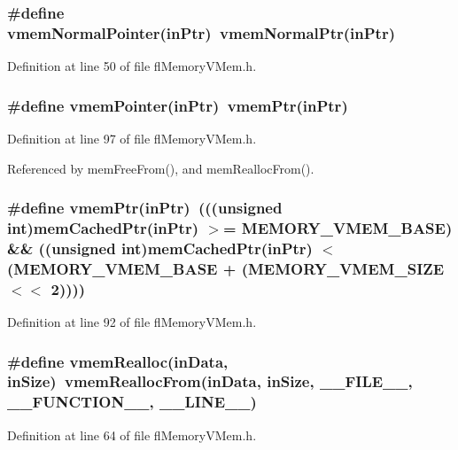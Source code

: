\subsubsection{\setlength{\rightskip}{0pt plus 5cm}\#define vmem\-Normal\-Pointer(in\-Ptr)~vmem\-Normal\-Ptr(in\-Ptr)}\label{flMemoryVMem_8h_ce904a03fd230296b350f5aa8e2c575c}




Definition at line 50 of file fl\-Memory\-VMem.h.
\subsubsection{\setlength{\rightskip}{0pt plus 5cm}\#define vmem\-Pointer(in\-Ptr)~vmem\-Ptr(in\-Ptr)}\label{flMemoryVMem_8h_69504d2681b13941b344f3df8b4d9704}




Definition at line 97 of file fl\-Memory\-VMem.h.

Referenced by mem\-Free\-From(), and mem\-Realloc\-From().
\subsubsection{\setlength{\rightskip}{0pt plus 5cm}\#define vmem\-Ptr(in\-Ptr)~(((unsigned int)mem\-Cached\-Ptr(in\-Ptr) $>$= MEMORY\_\-VMEM\_\-BASE) \&\& ((unsigned int)mem\-Cached\-Ptr(in\-Ptr) $<$ (MEMORY\_\-VMEM\_\-BASE + (MEMORY\_\-VMEM\_\-SIZE $<$$<$ 2))))}\label{flMemoryVMem_8h_156eba5fc751359ce629fa18628230f1}




Definition at line 92 of file fl\-Memory\-VMem.h.
\subsubsection{\setlength{\rightskip}{0pt plus 5cm}\#define vmem\-Realloc(in\-Data, in\-Size)~vmem\-Realloc\-From(in\-Data, in\-Size, \_\-\_\-FILE\_\-\_\-, \_\-\_\-FUNCTION\_\-\_\-, \_\-\_\-LINE\_\-\_\-)}\label{flMemoryVMem_8h_af5cdda99d87fc85f7c3bddea6be96b0}




Definition at line 64 of file fl\-Memory\-VMem.h.

